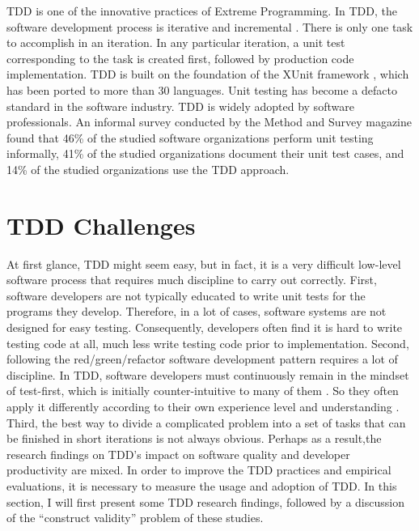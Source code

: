 TDD is one of the innovative practices of Extreme Programming. In TDD, the software development process is iterative and incremental \cite{Larman:03}. There is only one task to accomplish in an iteration. In any particular iteration, a unit test corresponding to the task is created first, followed by production code implementation. TDD is built on the foundation of the XUnit framework \cite{XUnit}, which has been ported to more than 30 languages. Unit testing has become a defacto standard in the software industry. TDD is widely adopted by software professionals. An informal survey \cite{UnitTestingPoll:06} conducted by the Method and Survey magazine found that 46\% of the studied software organizations perform unit testing informally, 41\% of the studied organizations document their unit test cases, and 14\% of the studied organizations use the TDD approach.

\section{TDD Challenges}
At first glance, TDD might seem easy, but in fact, it is a very difficult low-level software process that requires much discipline to carry out correctly. First, software developers are not typically educated to write unit tests for the programs they develop. Therefore, in a lot of cases, software systems are not designed for easy testing. Consequently, developers often find it is hard to write testing code at all, much less write testing code prior to implementation. Second, following the red/green/refactor software development pattern requires a lot of discipline. In TDD, software developers must continuously remain in the mindset of test-first, which is initially counter-intuitive to many of them \cite{Beck:01,Wang:04}. So they often apply it differently according to their own experience level and understanding \cite{Beck:01}. Third, the best way to divide a complicated problem into a set of tasks that can be finished in short iterations is not always obvious. Perhaps as a result,the research findings on TDD's impact on software quality and developer productivity are mixed. In order to improve the TDD practices and empirical evaluations, it is necessary to measure the usage and adoption of TDD. In this section, I will first present some TDD research findings, followed by a discussion of the ``construct validity'' problem of these studies.

